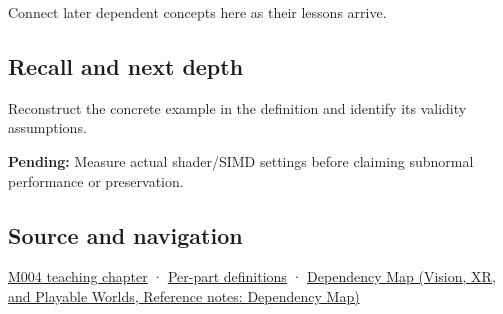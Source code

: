 \hypertarget{appendix-e979eb012782-used-by}{}

Connect later dependent concepts here as their lessons arrive.

\subsection{Recall and next depth}\label{appendix-e979eb012782-recall-and-next-depth}

\hypertarget{appendix-e979eb012782-recall-and-next-depth}{}

Reconstruct the concrete example in the definition and identify its validity assumptions.

\textbf{Pending:} Measure actual shader/SIMD settings before claiming subnormal performance or preservation.

\subsection{Source and navigation}\label{appendix-e979eb012782-source-and-navigation}

\hypertarget{appendix-e979eb012782-source-and-navigation}{}

\hyperref[01-foundations-i-ch001-a-stretching-ruler-for-real-valued-quantities]{M004 teaching chapter} · \hyperref[appendix-fd090d982a15-m004---parts-61-76]{Per-part definitions} · \href{../07-Vision-XR-and-Playable-Worlds/main.pdf\#nameddest=appendix-4ad47bdd269a}{Dependency Map (Vision, XR, and Playable Worlds, Reference notes: Dependency Map)}
